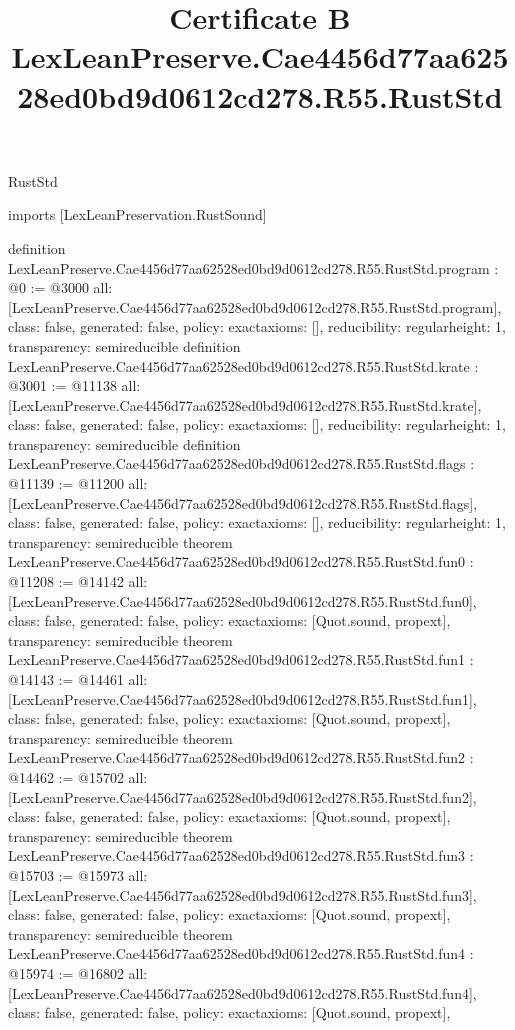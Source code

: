 \begin{lexlean}{RustStd}
\title{Certificate B LexLeanPreserve.Cae4456d77aa62528ed0bd9d0612cd278.R55.RustStd}
\begin{coremodule}
imports [LexLeanPreservation.RustSound]

definition LexLeanPreserve.Cae4456d77aa62528ed0bd9d0612cd278.R55.RustStd.program : @0 := @3000 {
  all: [LexLeanPreserve.Cae4456d77aa62528ed0bd9d0612cd278.R55.RustStd.program],
  class: false,
  generated: false,
  policy: exact{axioms: []},
  reducibility: regular{height: 1},
  transparency: semireducible
}
definition LexLeanPreserve.Cae4456d77aa62528ed0bd9d0612cd278.R55.RustStd.krate : @3001 := @11138 {
  all: [LexLeanPreserve.Cae4456d77aa62528ed0bd9d0612cd278.R55.RustStd.krate],
  class: false,
  generated: false,
  policy: exact{axioms: []},
  reducibility: regular{height: 1},
  transparency: semireducible
}
definition LexLeanPreserve.Cae4456d77aa62528ed0bd9d0612cd278.R55.RustStd.flags : @11139 := @11200 {
  all: [LexLeanPreserve.Cae4456d77aa62528ed0bd9d0612cd278.R55.RustStd.flags],
  class: false,
  generated: false,
  policy: exact{axioms: []},
  reducibility: regular{height: 1},
  transparency: semireducible
}
theorem LexLeanPreserve.Cae4456d77aa62528ed0bd9d0612cd278.R55.RustStd.fun0 : @11208 := @14142 {
  all: [LexLeanPreserve.Cae4456d77aa62528ed0bd9d0612cd278.R55.RustStd.fun0],
  class: false,
  generated: false,
  policy: exact{axioms: [Quot.sound, propext]},
  transparency: semireducible
}
theorem LexLeanPreserve.Cae4456d77aa62528ed0bd9d0612cd278.R55.RustStd.fun1 : @14143 := @14461 {
  all: [LexLeanPreserve.Cae4456d77aa62528ed0bd9d0612cd278.R55.RustStd.fun1],
  class: false,
  generated: false,
  policy: exact{axioms: [Quot.sound, propext]},
  transparency: semireducible
}
theorem LexLeanPreserve.Cae4456d77aa62528ed0bd9d0612cd278.R55.RustStd.fun2 : @14462 := @15702 {
  all: [LexLeanPreserve.Cae4456d77aa62528ed0bd9d0612cd278.R55.RustStd.fun2],
  class: false,
  generated: false,
  policy: exact{axioms: [Quot.sound, propext]},
  transparency: semireducible
}
theorem LexLeanPreserve.Cae4456d77aa62528ed0bd9d0612cd278.R55.RustStd.fun3 : @15703 := @15973 {
  all: [LexLeanPreserve.Cae4456d77aa62528ed0bd9d0612cd278.R55.RustStd.fun3],
  class: false,
  generated: false,
  policy: exact{axioms: [Quot.sound, propext]},
  transparency: semireducible
}
theorem LexLeanPreserve.Cae4456d77aa62528ed0bd9d0612cd278.R55.RustStd.fun4 : @15974 := @16802 {
  all: [LexLeanPreserve.Cae4456d77aa62528ed0bd9d0612cd278.R55.RustStd.fun4],
  class: false,
  generated: false,
  policy: exact{axioms: [Quot.sound, propext]},
}
\end{coremodule}
\end{lexlean}
